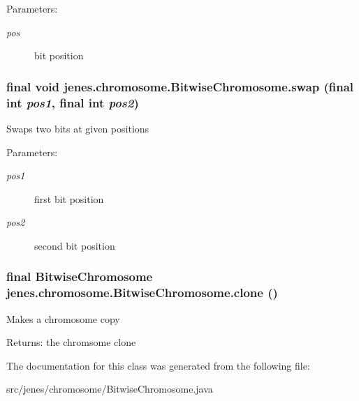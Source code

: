 \begin{Desc}
\item[Parameters:]
\begin{description}
\item[{\em pos}]bit position \end{description}
\end{Desc}
\hypertarget{classjenes_1_1chromosome_1_1_bitwise_chromosome_fac4935f0e1d92b6b1aaf9de024e8cbb}{
\subsubsection[swap]{\setlength{\rightskip}{0pt plus 5cm}final void jenes.chromosome.BitwiseChromosome.swap (final int {\em pos1}, \/  final int {\em pos2})}}
\label{classjenes_1_1chromosome_1_1_bitwise_chromosome_fac4935f0e1d92b6b1aaf9de024e8cbb}


Swaps two bits at given positions

\begin{Desc}
\item[Parameters:]
\begin{description}
\item[{\em pos1}]first bit position \item[{\em pos2}]second bit position \end{description}
\end{Desc}
\hypertarget{classjenes_1_1chromosome_1_1_bitwise_chromosome_2140b588068c430eaea7e9a7a5fe6b00}{
\subsubsection[clone]{\setlength{\rightskip}{0pt plus 5cm}final {\bf BitwiseChromosome} jenes.chromosome.BitwiseChromosome.clone ()}}
\label{classjenes_1_1chromosome_1_1_bitwise_chromosome_2140b588068c430eaea7e9a7a5fe6b00}


Makes a chromosome copy

\begin{Desc}
\item[Returns:]the chromsome clone \end{Desc}


The documentation for this class was generated from the following file:\begin{CompactItemize}
\item 
src/jenes/chromosome/BitwiseChromosome.java\end{CompactItemize}
